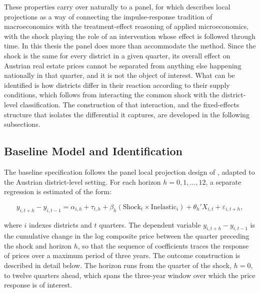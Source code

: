 \documentclass[a4paper,12pt, headsepline]{scrartcl}
\numberwithin{equation}{section}
\begin{document}
These properties carry over naturally to a panel, for which \citet{jorda2023} describes local projections as a way of connecting the impulse-response tradition of macroeconomics with the treatment-effect reasoning of applied microeconomics, with the shock playing the role of an intervention whose effect is followed through time. In this thesis the panel does more than accommodate the method. Since the shock is the same for every district in a given quarter, its overall effect on Austrian real estate prices cannot be separated from anything else happening nationally in that quarter, and it is not the object of interest. What can be identified is how districts differ in their reaction according to their supply conditions, which follows from interacting the common shock with the district-level classification. The construction of that interaction, and the fixed-effects structure that isolates the differential it captures, are developed in the following subsections.

\subsection{Baseline Model and Identification}\label{subsec:baseline}
The baseline specification follows the panel local projection design of \citet{aastveit2022}, adapted to the Austrian district-level setting. For each horizon $h = 0, 1, \ldots, 12$, a separate regression is estimated of the form:

\begin{equation}
	y_{i,t+h} - y_{i,t-1} = \alpha_{i,h} + \tau_{t,h}
		+ \beta_h \left( \text{Shock}_t \times \text{Inelastic}_i \right)
		+ \theta_h' X_{i,t} + \varepsilon_{i,t+h}, \label{eq:lp}
\end{equation}

where $i$ indexes districts and $t$ quarters. The dependent variable $y_{i,t+h} - y_{i,t-1}$ is the cumulative change in the log composite price between the quarter preceding the shock and horizon $h$, so that the sequence of coefficients traces the response of prices over a maximum period of three years. The outcome construction is described in detail below. The horizon runs from the quarter of the shock, $h = 0$, to twelve quarters ahead, which spans the three-year window over which the price response is of interest.
\end{document}
